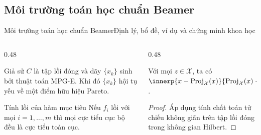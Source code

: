 \documentclass[aspectratio=43,10pt]{beamer}
\begin{document}
\subsection{Môi trường toán học chuẩn Beamer}
\begin{frame}{Môi trường toán học chuẩn Beamer}{Định lý, bổ đề, ví dụ và chứng minh khoa học}
  \begin{columns}[T]
    \begin{column}{0.48\textwidth}
      \begin{theorem}
        Giả sử $C$ là tập lồi đóng và dãy $\{x_k\}$ sinh bởi thuật toán MPG-E. Khi đó $\{x_k\}$ hội tụ yếu về một điểm hữu hiệu Pareto.
      \end{theorem}
      \vskip 2pt
      \begin{exampleblock}{Tính lồi của hàm mục tiêu}
        Nếu $f_i$ lồi với mọi $i = 1,\dots,m$ thì mọi cực tiểu cục bộ đều là cực tiểu toàn cục.
      \end{exampleblock}
    \end{column}

    \begin{column}{0.48\textwidth}
      \begin{lemma}
        Với mọi $z \in \mathcal{X}$, ta có $\innerp{x - \mathrm{Proj}_{\mathcal{X}}(x)}{\mathrm{Proj}_{\mathcal{X}}(x) - z} \ge 0$.
      \end{lemma}
      \vskip 2pt
      \begin{proof}
        Áp dụng tính chất toán tử chiếu không giãn trên tập lồi đóng trong không gian Hilbert.
      \end{proof}
    \end{column}
  \end{columns}
\end{frame}
\end{document}
